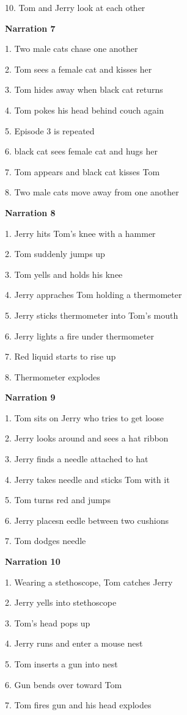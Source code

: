 \documentclass[]{elsarticle} %
\begin{document}
10. Tom and Jerry look at each other

\textbf{Narration 7}

1. Two male cats chase one another

2. Tom sees a female cat and kisses her

3. Tom hides away when black cat returns

4. Tom pokes his head behind couch again

5. Episode 3 is repeated

6. black cat sees female cat and hugs her

7. Tom appears and black cat kisses Tom

8. Two male cats move away from one another

\textbf{Narration 8}

1. Jerry hits Tom's knee with a hammer

2. Tom suddenly jumps up

3. Tom yells and holds his knee

4. Jerry appraches Tom holding a thermometer

5. Jerry sticks thermometer into Tom's mouth

6. Jerry lights a fire under thermometer

7. Red liquid starts to rise up

8. Thermometer explodes

\textbf{Narration 9}

1. Tom sits on Jerry who tries to get loose

2. Jerry looks around and sees a hat ribbon

3. Jerry finds a needle attached to hat

4. Jerry takes needle and sticks Tom with it

5. Tom turns red and jumps

6. Jerry placesn eedle between two cushions

7. Tom dodges needle

\textbf{Narration 10}

1. Wearing a stethoscope, Tom catches Jerry

2. Jerry yells into stethoscope

3. Tom's head pops up

4. Jerry runs and enter a mouse nest

5. Tom inserts a gun into nest

6. Gun bends over toward Tom

7. Tom fires gun and his head explodes
\end{document}
